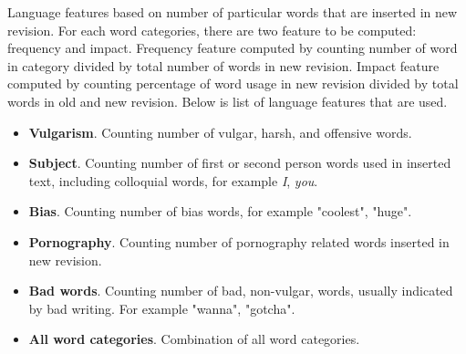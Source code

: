 Language features based on number of particular words that are inserted in new
revision.
For each word categories, there are two feature to be computed: frequency and
impact.
Frequency feature computed by counting number of word in category divided by
total number of words in new revision.
Impact feature computed by counting percentage of word usage in new revision
divided by total words in old and new revision.
Below is list of language features that are used.

\begin{itemize}
\item \textbf{Vulgarism}. Counting number of vulgar, harsh, and offensive
words.
\item \textbf{Subject}. Counting number of first or second person
words used in inserted text, including colloquial words, for example
\textit{I}, \textit{you}.
\item \textbf{Bias}. Counting number of bias words, for example "coolest",
"huge".
\item \textbf{Pornography}. Counting number of pornography related words
inserted in new revision.
\item \textbf{Bad words}. Counting number of bad, non-vulgar, words, usually
indicated by bad writing. For example "wanna", "gotcha".
\item \textbf{All word categories}. Combination of all word categories.
\end{itemize}
